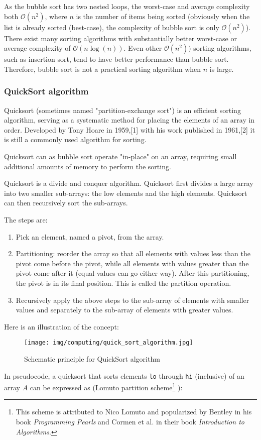 	As the bubble sort has two nested loops, the worst-case and average complexity both $\mathcal{O}(n^2)$, where $n$ is the number of items being sorted (obviously when the list is already sorted (best-case), the complexity of bubble sort is only $\mathcal{O}(n^2)$). There exist many sorting algorithms with substantially better worst-case or average complexity of  $\mathcal{O}(n \log(n))$. Even other $\mathcal{O}(n^2))$ sorting algorithms, such as insertion sort, tend to have better performance than bubble sort. Therefore, bubble sort is not a practical sorting algorithm when $n$ is large.
	
	\subsubsection{QuickSort algorithm}
	Quicksort (sometimes named "partition-exchange sort") is an efficient sorting algorithm, serving as a systematic method for placing the elements of an array in order. Developed by Tony Hoare in 1959,[1] with his work published in 1961,[2] it is still a commonly used algorithm for sorting.

	Quicksort can as bubble sort operate "in-place" on an array, requiring small additional amounts of memory to perform the sorting.

	Quicksort is a divide and conquer algorithm. Quicksort first divides a large array into two smaller sub-arrays: the low elements and the high elements. Quicksort can then recursively sort the sub-arrays.

	The steps are:
	\begin{enumerate}
		\item Pick an element, named a pivot, from the array.

		\item Partitioning: reorder the array so that all elements with values less than the pivot come before the pivot, while all elements with values greater than the pivot come after it (equal values can go either way). After this partitioning, the pivot is in its final position. This is called the partition operation.

		\item Recursively apply the above steps to the sub-array of elements with smaller values and separately to the sub-array of elements with greater values.
	\end{enumerate}

	Here is an illustration of the concept:
	\begin{figure}[H]
		\centering
		\texttt{[image: img/computing/quick\_sort\_algorithm.jpg]}
		\caption{Schematic principle for QuickSort algorithm}
	\end{figure}
	 In pseudocode, a quicksort that sorts elements \texttt{lo} through \texttt{hi} (inclusive) of an array $A$ can be expressed as (Lomuto partition scheme\footnote{This scheme is attributed to Nico Lomuto and popularized by Bentley in his book \textit{Programming Pearls} and Cormen et al. in their book \textit{Introduction to Algorithms}.}
):
	 
